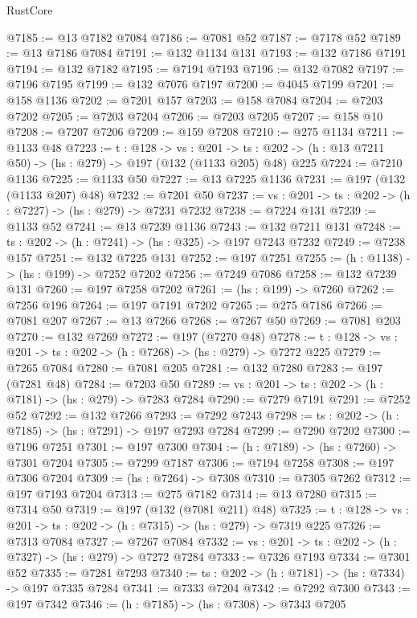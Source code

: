 \begin{lexlean}{RustCore}
\begin{coremodule}
@7185 := @13 @7182 @7084
@7186 := @7081 @52
@7187 := @7178 @52
@7189 := @13 @7186 @7084
@7191 := @132 @1134 @131
@7193 := @132 @7186 @7191
@7194 := @132 @7182
@7195 := @7194 @7193
@7196 := @132 @7082
@7197 := @7196 @7195
@7199 := @132 @7076 @7197
@7200 := @4045 @7199
@7201 := @158 @1136
@7202 := @7201 @157
@7203 := @158 @7084
@7204 := @7203 @7202
@7205 := @7203 @7204
@7206 := @7203 @7205
@7207 := @158 @10
@7208 := @7207 @7206
@7209 := @159 @7208
@7210 := @275 @1134
@7211 := @1133 @48
@7223 := {t : @128} ->
  {vs : @201} ->
  {ts : @202} -> (h : @13 @7211 @50) -> (hs : @279) -> @197 (@132 (@1133 @205) @48) @225
@7224 := @7210 @1136
@7225 := @1133 @50
@7227 := @13 @7225 @1136
@7231 := @197 (@132 (@1133 @207) @48)
@7232 := @7201 @50
@7237 := {vs : @201} -> {ts : @202} -> (h : @7227) -> (hs : @279) -> @7231 @7232
@7238 := @7224 @131
@7239 := @1133 @52
@7241 := @13 @7239 @1136
@7243 := @132 @7211 @131
@7248 := {ts : @202} -> (h : @7241) -> (hs : @325) -> @197 @7243 @7232
@7249 := @7238 @157
@7251 := @132 @7225 @131
@7252 := @197 @7251
@7255 := (h : @1138) -> (hs : @199) -> @7252 @7202
@7256 := @7249 @7086
@7258 := @132 @7239 @131
@7260 := @197 @7258 @7202
@7261 := (hs : @199) -> @7260
@7262 := @7256 @196
@7264 := @197 @7191 @7202
@7265 := @275 @7186
@7266 := @7081 @207
@7267 := @13 @7266
@7268 := @7267 @50
@7269 := @7081 @203
@7270 := @132 @7269
@7272 := @197 (@7270 @48)
@7278 := {t : @128} -> {vs : @201} -> {ts : @202} -> (h : @7268) -> (hs : @279) -> @7272 @225
@7279 := @7265 @7084
@7280 := @7081 @205
@7281 := @132 @7280
@7283 := @197 (@7281 @48)
@7284 := @7203 @50
@7289 := {vs : @201} -> {ts : @202} -> (h : @7181) -> (hs : @279) -> @7283 @7284
@7290 := @7279 @7191
@7291 := @7252 @52
@7292 := @132 @7266
@7293 := @7292 @7243
@7298 := {ts : @202} -> (h : @7185) -> (hs : @7291) -> @197 @7293 @7284
@7299 := @7290 @7202
@7300 := @7196 @7251
@7301 := @197 @7300
@7304 := (h : @7189) -> (hs : @7260) -> @7301 @7204
@7305 := @7299 @7187
@7306 := @7194 @7258
@7308 := @197 @7306 @7204
@7309 := (hs : @7264) -> @7308
@7310 := @7305 @7262
@7312 := @197 @7193 @7204
@7313 := @275 @7182
@7314 := @13 @7280
@7315 := @7314 @50
@7319 := @197 (@132 (@7081 @211) @48)
@7325 := {t : @128} -> {vs : @201} -> {ts : @202} -> (h : @7315) -> (hs : @279) -> @7319 @225
@7326 := @7313 @7084
@7327 := @7267 @7084
@7332 := {vs : @201} -> {ts : @202} -> (h : @7327) -> (hs : @279) -> @7272 @7284
@7333 := @7326 @7193
@7334 := @7301 @52
@7335 := @7281 @7293
@7340 := {ts : @202} -> (h : @7181) -> (hs : @7334) -> @197 @7335 @7284
@7341 := @7333 @7204
@7342 := @7292 @7300
@7343 := @197 @7342
@7346 := (h : @7185) -> (hs : @7308) -> @7343 @7205

\end{coremodule}
\end{lexlean}

